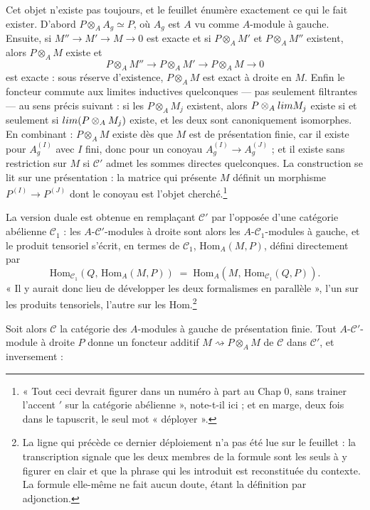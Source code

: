 \documentclass[11pt,a4paper]{article}
\begin{document}
Cet objet n'existe pas toujours, et le feuillet énumère exactement ce qui le
fait exister. D'abord $P \otimes_{A} A_{g} \simeq P$, où $A_{g}$ est $A$ vu
comme $A$-module à gauche. Ensuite, si $M'' \to M' \to M \to 0$ est exacte et si
$P \otimes_{A} M'$ et $P \otimes_{A} M''$ existent, alors $P \otimes_{A} M$
existe et
\[
  P \otimes_{A} M'' \longrightarrow P \otimes_{A} M' \longrightarrow
  P \otimes_{A} M \longrightarrow 0
\]
est exacte : sous réserve d'existence, $P \otimes_{A} M$ est exact à droite en
$M$. Enfin le foncteur commute aux limites inductives quelconques — pas
seulement filtrantes — au sens précis suivant : si les $P \otimes_{A} M_{j}$
existent, alors $P \otimes_{A} \varinjlim M_{j}$ existe si et seulement si
$\varinjlim (P \otimes_{A} M_{j})$ existe, et les deux sont canoniquement
isomorphes. En combinant : $P \otimes_{A} M$ existe dès que $M$ est de
présentation finie, car il existe pour $A_{g}^{(I)}$ avec $I$ fini, donc pour un
conoyau $A_{g}^{(I)} \to A_{g}^{(J)}$ ; et il existe sans restriction sur $M$ si
$\mathcal{C}'$ admet les sommes directes quelconques. La construction se lit sur
une présentation : la matrice qui présente $M$ définit un morphisme
$P^{(I)} \to P^{(J)}$ dont le conoyau est l'objet cherché.\footnote{« Tout ceci
devrait figurer dans un numéro à part au Chap 0, sans trainer l'accent $'$ sur
la catégorie abélienne », note-t-il ici ; et en marge, deux fois dans le
tapuscrit, le seul mot « déployer ».}

La version duale est obtenue en remplaçant $\mathcal{C}'$ par l'opposée d'une
catégorie abélienne $\mathcal{C}_{1}$ : les $A$-$\mathcal{C}'$-modules à droite
sont alors les $A$-$\mathcal{C}_{1}$-modules à gauche, et le produit tensoriel
s'écrit, en termes de $\mathcal{C}_{1}$, $\mathrm{Hom}_{A}(M,P)$, défini
directement par
\[
  \mathrm{Hom}_{\mathcal{C}_{1}}(Q,\, \mathrm{Hom}_{A}(M,P))
  \;=\;
  \mathrm{Hom}_{A}(M,\, \mathrm{Hom}_{\mathcal{C}_{1}}(Q,P)) .
\]
« Il y aurait donc lieu de développer les deux formalismes en parallèle », l'un
sur les produits tensoriels, l'autre sur les Hom.\footnote{La ligne qui précède
ce dernier déploiement n'a pas été lue sur le feuillet : la transcription
signale que les deux membres de la formule sont les seuls à y figurer en clair
et que la phrase qui les introduit est reconstituée du contexte. La formule
elle-même ne fait aucun doute, étant la définition par adjonction.}

Soit alors $\mathcal{C}$ la catégorie des $A$-modules à gauche de présentation
finie. Tout $A$-$\mathcal{C}'$-module à droite $P$ donne un foncteur additif
$M \rightsquigarrow P \otimes_{A} M$ de $\mathcal{C}$ dans $\mathcal{C}'$, et
inversement :
\end{document}
